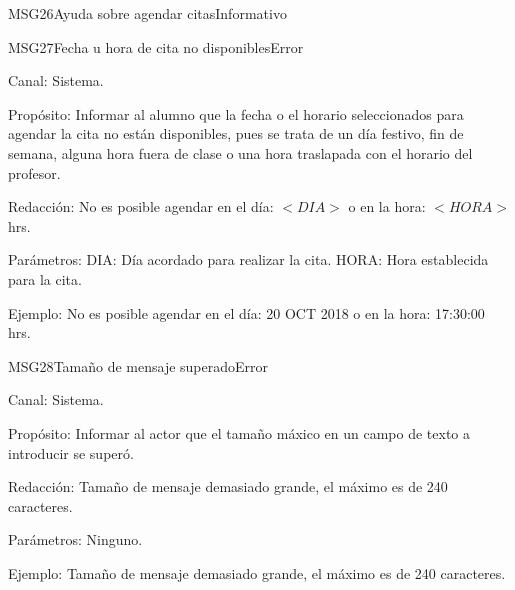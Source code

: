 \begin{mensaje}{MSG26}{Ayuda sobre agendar citas}{Informativo}
\end{mensaje}

\begin{mensaje}{MSG27}{Fecha u hora de cita no disponibles}{Error}
	\item[Canal:] Sistema.
    \item[Propósito:] Informar al alumno que la fecha o el horario seleccionados para agendar la cita no están disponibles, pues se trata de un día festivo, fin de semana, alguna hora fuera de clase o una hora traslapada con el horario del profesor.
    \item[Redacción:] No es posible agendar en el día: $<DIA>$ o en la hora: $<HORA>$hrs. 
    \item[Parámetros:] DIA: Día acordado para realizar la cita. HORA: Hora establecida para la cita.
    \item[Ejemplo:] No es posible agendar en el día: 20 OCT 2018 o en la hora: 17:30:00 hrs.
\end{mensaje}

\begin{mensaje}{MSG28}{Tamaño de mensaje superado}{Error}
	\item[Canal:] Sistema.
    \item[Propósito:] Informar al actor que el tamaño máxico en un campo de texto a introducir se superó. 
    \item[Redacción:] Tamaño de mensaje demasiado grande, el máximo es de 240 caracteres.
    \item[Parámetros:] Ninguno.
    \item[Ejemplo:] Tamaño de mensaje demasiado grande, el máximo es de 240 caracteres.
\end{mensaje}

